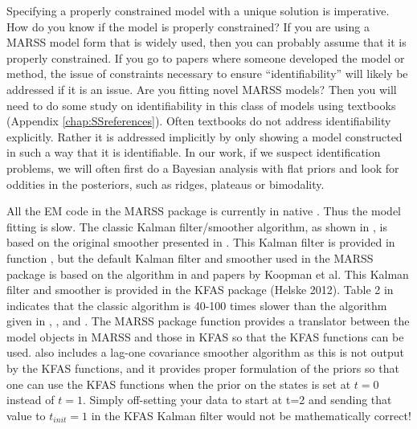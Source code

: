 Specifying a properly constrained model with a unique solution is imperative.  How do you know if the model is properly constrained?  If you are using a MARSS model form that is widely used, then you can probably assume that it is properly constrained. If you go to papers where someone developed the model or method, the issue of constraints necessary to ensure ``identifiability'' will likely be addressed if it is an issue.  Are you fitting novel MARSS models? Then you will need to do some study on identifiability in this class of models using textbooks (Appendix \ref{chap:SSreferences}).  Often textbooks do not address identifiability explicitly.  Rather it is addressed implicitly by only showing a model constructed in such a way that it is identifiable.  In our work, if we suspect identification problems, we will often first do a Bayesian analysis with flat priors and look for oddities in the posteriors, such as ridges, plateaus or bimodality.
 
All the EM code in the MARSS package is currently in native \R.  Thus the model fitting is slow.  The classic Kalman filter/smoother algorithm, as shown in \citet[p. 331-335]{ShumwayStoffer2006}, is based on the original smoother presented in \citet{Rauch1963}. This Kalman filter is provided in function \verb@MARSSkfss@, but the default Kalman filter and smoother used in the MARSS package is based on the algorithm in \citet{KohnAnsley1989} and papers by Koopman et al. This Kalman filter and smoother is provided in the KFAS package (Helske 2012).  Table 2 in \citet{Koopman1993} indicates that the classic algorithm is 40-100 times slower than the algorithm given in \citet{KohnAnsley1989}, \citet{Koopman1993}, and \citet{Koopmanetal1998}. The MARSS package function \verb@MARSSkfas@ provides a translator between the model objects in MARSS and those in KFAS so that the KFAS functions can be used.  \verb@MARSSkfas@ also includes a lag-one covariance smoother algorithm as this is not output by the KFAS functions, and it provides proper formulation of the priors so that one can use the KFAS functions when the prior on the states is set at $t=0$ instead of $t=1$. Simply off-setting your data to start at t=2 and sending that value to $t_{init}=1$ in the KFAS Kalman filter would not be mathematically correct!

